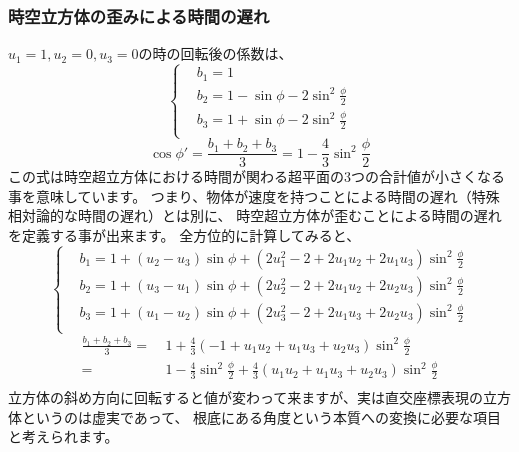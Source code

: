 \documentclass[a4paper,12pt,notitlepage]{jsreport}
\begin{document}
\subsubsection{時空立方体の歪みによる時間の遅れ}

$ u_1 = 1, u_2 = 0, u_3 = 0 $の時の回転後の係数は、
\begin{equation}
  \left\{
    \begin{aligned}
      &b_1 = 1 \\
      &b_2 = 1 - \sin \phi - 2 \sin^2 \frac{\phi}{2} \\
      &b_3 = 1 + \sin \phi - 2 \sin^2 \frac{\phi}{2} \\
    \end{aligned}
  \right.
\end{equation}
\begin{equation}
  \cos \phi' = \frac{b_1 + b_2 + b_3}{3} = 1 - \frac{4}{3} \sin^2 \frac{\phi}{2}
\end{equation}
この式は時空超立方体における時間が関わる超平面の3つの合計値が小さくなる事を意味しています。
つまり、物体が速度を持つことによる時間の遅れ（特殊相対論的な時間の遅れ）とは別に、
時空超立方体が歪むことによる時間の遅れを定義する事が出来ます。
全方位的に計算してみると、
\begin{equation}
  \left\{
    \begin{aligned}
      &b_1 = 1 + (u_2 - u_3) \sin \phi + (2 u_1^2 - 2 + 2 u_1 u_2 + 2 u_1 u_3) \sin^2 \frac{\phi}{2} \\
      &b_2 = 1 + (u_3 - u_1) \sin \phi + (2 u_2^2 - 2 + 2 u_1 u_2 + 2 u_2 u_3) \sin^2 \frac{\phi}{2} \\
      &b_3 = 1 + (u_1 - u_2) \sin \phi + (2 u_3^2 - 2 + 2 u_1 u_3 + 2 u_2 u_3) \sin^2 \frac{\phi}{2} \\
    \end{aligned}
  \right.
\end{equation}
\begin{equation}
  \begin{split}
    \frac{b_1 + b_2 + b_3}{3} = ~ & 1 + \frac{4}{3} (-1 + u_1 u_2 + u_1 u_3 + u_2 u_3) \sin^2 \frac{\phi}{2} \\
    = ~ & 1 - \frac{4}{3} \sin^2 \frac{\phi}{2} + \frac{4}{3} (u_1 u_2 + u_1 u_3 + u_2 u_3) \sin^2 \frac{\phi}{2} \\
  \end{split}
\end{equation}
立方体の斜め方向に回転すると値が変わって来ますが、実は直交座標表現の立方体というのは虚実であって、
根底にある角度という本質への変換に必要な項目と考えられます。
\end{document}
